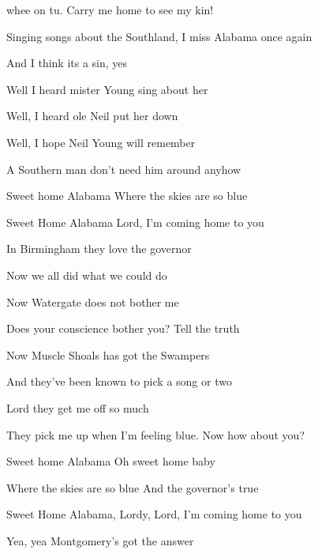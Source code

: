 

\zs
{} whee on tu.
Carry me home to see my kin!

Singing songs about the Southland,
I miss Alabama once again

And I think its a sin, yes
\ks

\zs
Well I heard mister Young sing about her

Well, I heard ole Neil put her down

Well, I hope Neil Young will remember

A Southern man don't need him around anyhow
\ks

\zr
Sweet home Alabama
Where the skies are so blue

Sweet Home Alabama
Lord, I'm coming home to you
\kr

\zs
In Birmingham they love the governor

Now we all did what we could do

Now Watergate does not bother me

Does your conscience bother you?
Tell the truth
\ks

\zr  \kr

\zs
Now Muscle Shoals has got the Swampers

And they've been known to pick a song or two

Lord they get me off so much

They pick me up when I'm feeling blue.
Now how about you?
\ks

\zr  \kr

\zr
Sweet home Alabama
Oh sweet home baby

Where the skies are so blue
And the governor's true
\kr

\zr
Sweet Home Alabama, Lordy, Lord, I'm coming home to you

Yea, yea Montgomery's got the answer
\kr

\kp






















